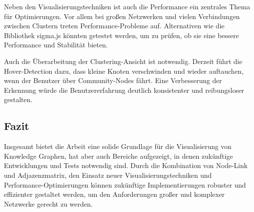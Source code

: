 Neben den Visualisierungstechniken ist auch die Performance ein zentrales Thema für Optimierungen. Vor allem bei großen Netzwerken und vielen Verbindungen zwischen Clustern treten Performance-Probleme auf. Alternativen wie die Bibliothek sigma.js könnten getestet werden, um zu prüfen, ob sie eine bessere Performance und Stabilität bieten.

Auch die Überarbeitung der Clustering-Ansicht ist notwendig. Derzeit führt die Hover-Detection dazu, dass kleine Knoten verschwinden und wieder auftauchen, wenn der Benutzer über Community-Nodes fährt. Eine Verbesserung der Erkennung würde die Benutzererfahrung deutlich konsistenter und reibungsloser gestalten.

\subsection{Fazit}

Insgesamt bietet die Arbeit eine solide Grundlage für die Visualisierung von Knowledge Graphen, hat aber auch Bereiche aufgezeigt, in denen zukünftige Entwicklungen und Tests notwendig sind. Durch die Kombination von Node-Link und Adjazenzmatrix, den Einsatz neuer Visualisierungstechniken und Performance-Optimierungen können zukünftige Implementierungen robuster und effizienter gestaltet werden, um den Anforderungen großer und komplexer Netzwerke gerecht zu werden.